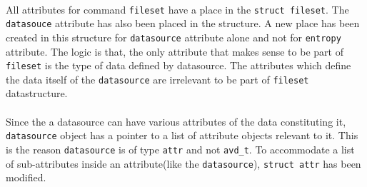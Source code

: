 \paragraph{}
All attributes for command \verb+fileset+ have a place in the \verb+struct fileset+. The \verb+datasouce+ attribute has also been placed in the structure. A new place has been created in this structure for \verb+datasource+ attribute alone and not for \verb+entropy+ attribute. The logic is that, the only attribute that makes sense to be part of \verb+fileset+ is the type of data defined by datasource. The attributes which define the data itself of the \verb+datasource+ are irrelevant to be part of \verb+fileset+ datastructure.
\paragraph{}
Since the a datasource can have various attributes of the data constituting it, \verb+datasource+ object has a pointer to a list of attribute objects relevant to it. This is the reason \verb+datasource+ is of type \verb+attr+ and not \verb+avd_t+. To accommodate  a list of sub-attributes inside an attribute(like the \verb+datasource+), \verb+struct attr+ has been modified.

